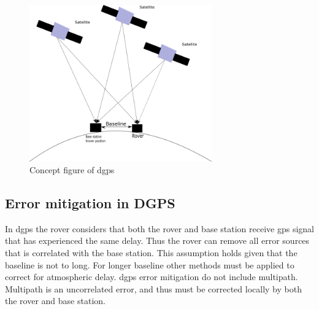 \begin{figure}[H]
	\centering
		\includegraphics[width=0.7\textwidth]{figs/DGPS.png}
		\caption{Concept figure of \acrfull{dgps}}
		\label{figure:DGPS}
\end{figure}
\subsection{Error mitigation in DGPS} \label{ss: Error mitigation DGPS}
In \gls{dgps} the rover considers that both the rover and base station receive \gls{gps} signal that has experienced the same delay. Thus the rover can remove all error sources that is correlated with the base station. This assumption holds given that the baseline is not to long. For longer baseline other methods must be applied to correct for atmospheric delay. \gls{dgps} error mitigation do not include multipath. Multipath is an uncorrelated error, and thus must be corrected locally by both the rover and base station.


